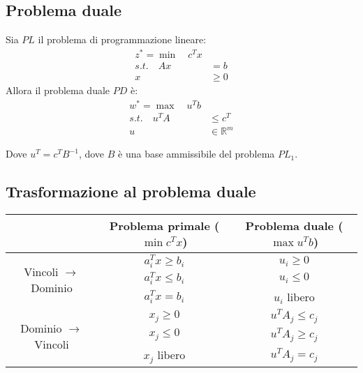 \documentclass[12pt]{article}
\begin{document}
\subsection{Problema duale}

Sia $PL$ il problema di programmazione lineare:
\begin{align*}
	z^* = \min \quad c^T x &        \\
	s.t. \quad Ax          & = b    \\
	x                      & \geq 0
\end{align*}
Allora il problema duale $PD$ è:
\begin{align*}
	w^* = \max \quad u^T b &                  \\
	s.t. \quad u^T A       & \leq c^T         \\
	u                      & \in \mathbb{R}^m
\end{align*}

Dove $u^T = c^T B^{-1}$, dove $B$ è una base ammissibile del problema $PL_1$.\\

\subsection{Trasformazione al problema duale}

\begin{table}[H]
	\centering
	\begin{tabular}{cc|c}
		                                               & \textbf{Problema primale} ($\min{c^Tx}$) & \textbf{Problema duale} ($\max {u^Tb}$) \\
		\hline
		\multirow{3}{*}{Vincoli $\rightarrow$ Dominio} & $a^T_i x \geq b_i$                       & $u_i \geq 0$                            \\
		                                               & $a^T_i x \leq b_i$                       & $u_i \leq 0$                            \\
		                                               & $a^T_i x = b_i$                          & $u_i$ libero                            \\
		\hline
		\multirow{3}{*}{Dominio $\rightarrow$ Vincoli} & $x_j \geq 0$                             & $u^TA_j \leq c_j$                       \\
		                                               & $x_j \leq 0$                             & $u^TA_j \geq c_j$                       \\
		                                               & $x_j$ libero                             & $u^TA_j = c_j$                          \\
	\end{tabular}
\end{table}
\end{document}
